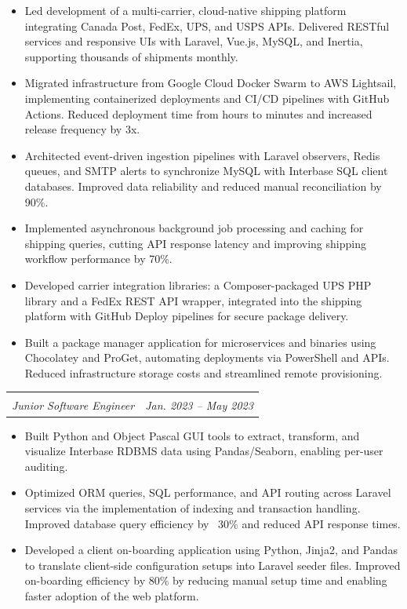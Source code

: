 \documentclass[letterpaper,11pt]{article}
\makeatletter
\newcommand{\resumeItem}[1]{\item\small{#1 \vspace{-3pt}}}
\newcommand{\resumeSubheading}[4]{%
  \vspace{3pt}\item
  \begin{tabular*}{0.97\textwidth}[t]{l@{\extracolsep{\fill}}r}
    \if\relax\detokenize{#1#2}\relax
    \else
      \textbf{#1} & #2 \\
    \fi
    \textit{\small #3} & \textit{\small #4} \\
  \end{tabular*}\vspace{-4pt}
}
\newcommand{\resumeItemListStart}{\begin{itemize}}
\newcommand{\resumeItemListEnd}{\end{itemize}\vspace{-5pt}}
\makeatother
\begin{document}
      \resumeItemListStart
        \resumeItem{Led development of a multi-carrier, cloud-native shipping platform integrating Canada Post, FedEx, UPS, and USPS APIs. Delivered RESTful services and responsive UIs with Laravel, Vue.js, MySQL, and Inertia, supporting thousands of shipments monthly.}
        \resumeItem{Migrated infrastructure from Google Cloud Docker Swarm to AWS Lightsail, implementing containerized deployments and CI/CD pipelines with GitHub Actions. Reduced deployment time from hours to minutes and increased release frequency by 3x.}
        \resumeItem{Architected event-driven ingestion pipelines with Laravel observers, Redis queues, and SMTP alerts to synchronize MySQL with Interbase SQL client databases. Improved data reliability and reduced manual reconciliation by 90\%.}
        \resumeItem{Implemented asynchronous background job processing and caching for shipping queries, cutting API response latency and improving shipping workflow performance by 70\%.}
        \resumeItem{Developed carrier integration libraries: a Composer-packaged UPS PHP library and a FedEx REST API wrapper, integrated into the shipping platform with GitHub Deploy pipelines for
secure package delivery.}
        \resumeItem{Built a package manager application for microservices and binaries using Chocolatey and ProGet, automating deployments via PowerShell and APIs. Reduced infrastructure storage costs and streamlined remote provisioning.}
      \resumeItemListEnd

    \resumeSubheading
        {}{}
      {Junior Software Engineer}{Jan. 2023 -- May 2023}
      \resumeItemListStart
        \resumeItem{Built Python and Object Pascal GUI tools to extract, transform, and visualize Interbase RDBMS data using Pandas/Seaborn, enabling per-user auditing.}
        \resumeItem{Optimized ORM queries, SQL performance, and API routing across Laravel services via the implementation of indexing and transaction handling. Improved database query efficiency by ~30\% and reduced API response times.}
        \resumeItem{Developed a client on-boarding application using Python, Jinja2, and Pandas to translate client-side configuration setups into Laravel seeder files. Improved on-boarding efficiency by 80\% by reducing manual setup time and enabling faster adoption of the web platform.}
      \resumeItemListEnd
\end{document}
